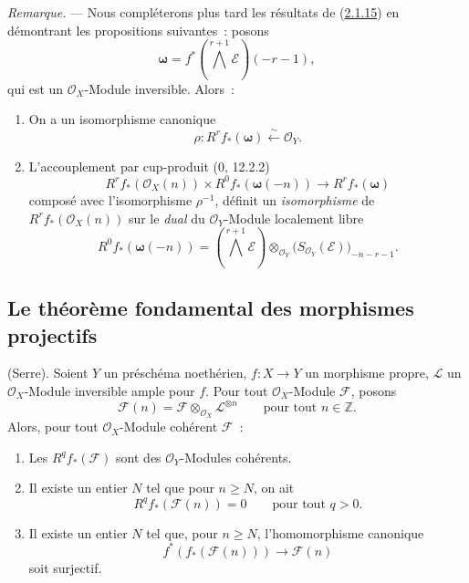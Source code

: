 \begin{env}[2.1.16]
\label{III.2.1.16-fr}
\emph{Remarque.} --- Nous compléterons plus tard les résultats de
(\hyperref[III.2.1.15-fr]{2.1.15}) en démontrant les propositions
suivantes~: posons
\[
\boldsymbol\omega=f^*\left(\bigwedge^{r+1}\mathcal E\right)(-r-1),
\]
qui est un $\mathcal O_X$-Module inversible. Alors~:
\begin{enumerate}
\item[{\rm(i)}] On a un isomorphisme canonique
\begin{equation}
\label{III.2.1.16.1-fr}
\tag{2.1.16.1}
\rho:R^rf_*(\boldsymbol\omega)\xleftarrow{\sim}\mathcal O_Y.
\end{equation}
\item[{\rm(ii)}] L'accouplement par cup-produit (0, 12.2.2)
\begin{equation}
\label{III.2.1.16.2-fr}
\tag{2.1.16.2}
R^rf_*(\mathcal O_X(n))\times R^0f_*(\boldsymbol\omega(-n))
\longrightarrow R^rf_*(\boldsymbol\omega)
\end{equation}
composé avec l'isomorphisme $\rho^{-1}$, définit un \emph{isomorphisme}
de $R^rf_*(\mathcal O_X(n))$ sur le \emph{dual} du $\mathcal O_Y$-Module
localement libre
\[
R^0f_*(\boldsymbol\omega(-n))
=\left(\bigwedge^{r+1}\mathcal E\right)
\otimes_{\mathcal O_Y}\bigl(S_{\mathcal O_Y}(\mathcal E)\bigr)_{-n-r-1}.
\]
\end{enumerate}
\end{env}
\subsection{Le théorème fondamental des morphismes projectifs}
\label{subsection:III.2.2-fr}

\begin{theorem}[2.2.1]
\label{III.2.2.1-fr}
(Serre). Soient $Y$ un préschéma noethérien, $f:X\to Y$ un morphisme
propre, $\mathcal L$ un $\mathcal O_X$-Module inversible ample pour $f$.
Pour tout $\mathcal O_X$-Module $\mathcal F$, posons
\[
\mathcal F(n)=\mathcal F\otimes_{\mathcal O_X}\mathcal L^{\otimes n}
\qquad\text{pour tout }n\in\mathbb Z.
\]
Alors, pour tout $\mathcal O_X$-Module cohérent $\mathcal F$~:
\begin{enumerate}
\item[{\rm(i)}] Les $R^qf_*(\mathcal F)$ sont des
$\mathcal O_Y$-Modules cohérents.
\item[{\rm(ii)}] Il existe un entier $N$ tel que pour $n\geq N$, on ait
\[
R^qf_*(\mathcal F(n))=0\qquad\text{pour tout }q>0.
\]
\item[{\rm(iii)}] Il existe un entier $N$ tel que, pour $n\geq N$,
l'homomorphisme canonique
\[
f^*(f_*(\mathcal F(n)))\longrightarrow\mathcal F(n)
\]
soit surjectif.
\end{enumerate}
\end{theorem}

